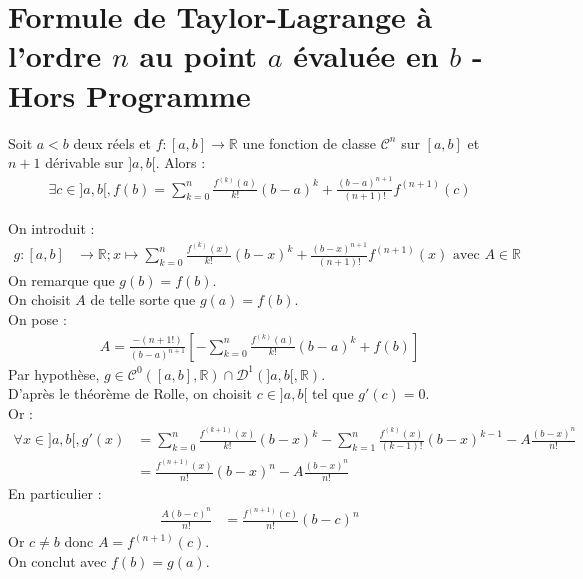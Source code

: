 \documentclass[../main.tex]{subfiles}
\begin{document}
\section{Formule de Taylor-Lagrange à l'ordre $n$ au point $a$ évaluée en $b$ - Hors Programme}
\begin{tcolorbox}[title=Théorème 25.22, title filled=false, colframe=orange, colback=orange!10!white]
    Soit $a < b$ deux réels et $f:[a, b] \to \mathbb{R}$ une fonction de classe $\mathcal{C}^n$ sur $[a, b]$ et $n+1$ dérivable sur $]a, b[$. Alors :
    \begin{align*}
        \exists c \in ]a, b[, f(b) = \sum_{k=0}^{n} \frac{f^{(k)}(a)}{k!} (b-a)^k + \frac{(b-a)^{n+1}}{(n+1)!} f^{(n+1)}(c)
    \end{align*}
\end{tcolorbox}

\noindent On introduit : 
\begin{align*}
    g: [a, b] &\to \mathbb{R}; x \mapsto \sum_{k=0}^{n} \frac{f^{(k)}(x)}{k!} (b-x)^k + \frac{(b-x)^{n+1}}{(n+1)!} f^{(n+1)}(x) \text{ avec } A \in \mathbb{R}
\end{align*}
On remarque que $g(b) = f(b)$. \\
On choisit $A$ de telle sorte que $g(a) = f(b)$. \\
On pose : 
\begin{align*}
    A = \frac{-(n+1!)}{(b-a)^{n+1}} \left[ -\sum_{k=0}^{n} \frac{f^{(k)}(a)}{k!} (b-a)^k + f(b) \right]
\end{align*}
Par hypothèse, $g\in \mathcal{C}^0([a, b], \mathbb{R}) \cap \mathcal{D}^1(]a, b[, \mathbb{R})$. \\
D'après le théorème de Rolle, on choisit $c\in ]a, b[$ tel que $g'(c) = 0$. \\
Or : 
\begin{align*}
    \forall x \in ]a, b[, g'(x) &= \sum_{k=0}^{n} \frac{f^{(k+1)}(x)}{k!} (b-x)^k - \sum_{k=1}^{n} \frac{f^{(k)}(x)}{(k-1)!} (b-x)^{k-1} - A \frac{(b-x)^n}{n!} \\
    &= \frac{f^{(n+1)}(x)}{n!} (b-x)^n - A \frac{(b-x)^n}{n!}
\end{align*}
En particulier : 
\begin{align*}
    \frac{A(b-c)^n}{n!} &= \frac{f^{(n+1)}(c)}{n!} (b-c)^n
\end{align*}
Or $c \neq b$ donc $A = f^{(n+1)}(c)$. \\
On conclut avec $f(b) = g(a)$.

\end{document}
